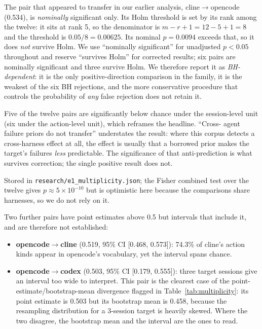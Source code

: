 \documentclass[11pt]{article}
\begin{document}
The pair that appeared to transfer in our earlier analysis,
cline$\to$opencode (0.534), is \emph{nominally} significant only. Its Holm
threshold is set by its rank among the twelve: it sits at rank 5, so the
denominator is $m - r + 1 = 12 - 5 + 1 = 8$ and the threshold is
$0.05/8 = 0.00625$. Its nominal $p = 0.0094$ exceeds that, so it does
\emph{not} survive Holm. We use ``nominally significant'' for unadjusted
$p < 0.05$ throughout and reserve ``survives Holm'' for corrected results;
six pairs are nominally significant and three survive Holm. We therefore report it as
\emph{BH-dependent}: it is the only positive-direction comparison in the
family, it is the weakest of the six BH rejections, and the more conservative
procedure that controls the probability of \emph{any} false rejection does not
retain it.

Five of the twelve pairs are significantly below chance under the session-level
unit (six under the action-level unit), which reframes the headline. ``Cross-
agent failure priors do not transfer'' understates the result: where this
corpus detects a cross-harness effect at all, the effect is usually that a
borrowed prior makes the target's failures \emph{less} predictable. The
significance of that anti-prediction is what survives correction; the single
positive result does not.

Stored in \texttt{research/e1\_multiplicity.json}; the Fisher combined test
over the twelve gives $p \approx 5\times10^{-10}$ but is optimistic here
because the comparisons share harnesses, so we do not rely on it.

Two further pairs have point estimates above 0.5 but intervals that
include it, and are therefore not established:
\begin{itemize}
\item \textbf{opencode$\to$cline} (0.519, 95\% CI [0.468, 0.573]):
  74.3\% of cline's action kinds appear in opencode's vocabulary, yet the
  interval spans chance.
\item \textbf{opencode$\to$codex} (0.503, 95\% CI [0.179, 0.555]):
  three target sessions give an interval too wide to interpret. This pair is
  the clearest case of the point-estimate/bootstrap-mean divergence flagged
  in Table~\ref{tab:multiplicity}: its point estimate is 0.503 but its
  bootstrap mean is 0.458, because the resampling distribution for a
  3-session target is heavily skewed. Where the two disagree, the bootstrap
  mean and the interval are the ones to read.
\end{itemize}
\end{document}
